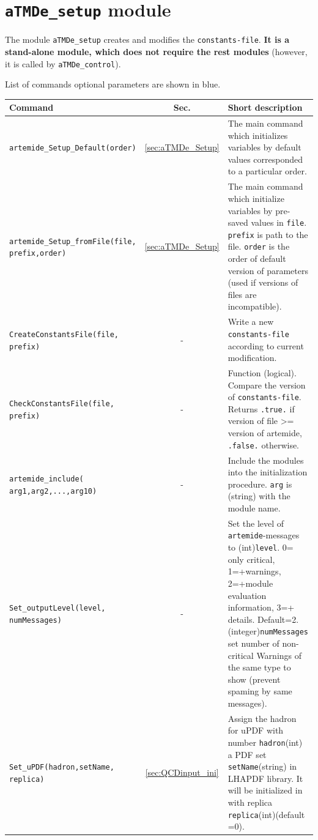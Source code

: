\documentclass[prd,nofootinbib,eqsecnum,final]{revtex4}
\renewcommand{\(}{\left(}
\renewcommand{\)}{\right)}
\renewcommand{\[}{\left[}
\renewcommand{\]}{\right]}
\newcommand{\blue}[1]{{\color{blue} #1}}
\begin{document}
\section{\texttt{aTMDe\_setup} module}
\label{aTMDe_setup}

The module \texttt{aTMDe\_setup} creates and modifies the \texttt{constants-file}. \textbf{It is a stand-alone module, which does not require the rest modules} (however, it is called by \texttt{aTMDe\_control}).

\begin{center}
List of commands \blue{optional parameters are shown in blue.}
\\
\begin{longtable}{||p{7cm}|c|p{10cm}||}
\hline\hline
Command & Sec. & Short description
\\\hline
\texttt{artemide\_Setup\_Default(order) } & \ref{sec:aTMDe_Setup} &  The main command which initializes variables by default values corresponded to a particular order.
\\\hline
\texttt{artemide\_Setup\_fromFile(file,\blue{prefix,order}) } & \ref{sec:aTMDe_Setup} &  The main command which initialize variables by pre-saved values in \texttt{file}. \texttt{prefix} is path to the file. \texttt{order} is the order of default version of parameters (used if versions of files are incompatible).
\\\hline
\texttt{CreateConstantsFile(file,\blue{prefix})} & - & Write a new \texttt{constants-file} according to current modification.
\\\hline
\texttt{CheckConstantsFile(file,\blue{prefix})} & - & Function (logical). Compare the version of \texttt{constants-file}. Returns \texttt{.true.} if version of file >= version of artemide, \texttt{.false.} otherwise.
\\\hline\hline
\texttt{artemide\_include(\blue{arg1,arg2,...,arg10}) } & - & Include the modules into the initialization procedure. \texttt{arg} is (string) with the module name.
\\\hline
\texttt{Set\_outputLevel(level,\blue{numMessages})} & - & Set the level of \texttt{artemide}-messages to (int)\texttt{level}. 0= only critical, 1=+warnings, 2=+module evaluation information, 3=+ details. Default=2. (integer)\texttt{numMessages} set number of non-critical Warnings of the same type to show (prevent spaming by same messages).
\\\hline
\texttt{Set\_uPDF(hadron,setName,\blue{replica}) } & \ref{sec:QCDinput_ini} & Assign the hadron for uPDF with number \texttt{hadron}(int) a PDF set \texttt{setName}(string) in LHAPDF library. It will be initialized in with replica \texttt{replica}(int)(default =0).

\end{longtable}
\end{center}
\end{document}
